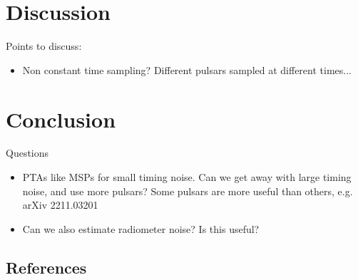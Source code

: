 \documentclass[fleqn,usenatbib,useAMS]{mnras}
\begin{document}
%
%
%








\section{Discussion}

Points to discuss:

\begin{itemize}
	\item Non constant time sampling? Different pulsars sampled at different times...
\end{itemize}

\section{Conclusion}

Questions 

\begin{itemize}
	\item PTAs like MSPs for small timing noise. Can we get away with large timing noise, and use more pulsars? Some pulsars are more useful than others, e.g. arXiv 2211.03201
	\item Can we also estimate radiometer noise? Is this useful?
\end{itemize}




\subsection{References}
\label{sec:ref_list}













\bsp	%
\label{lastpage}
\end{document}
